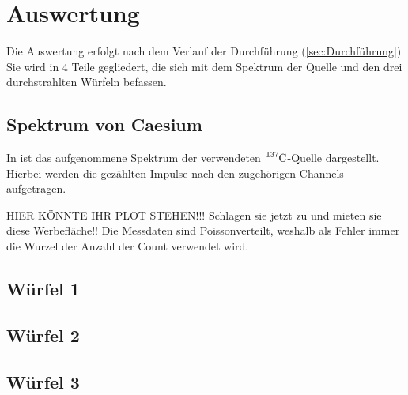 \section{Auswertung}
\label{sec:Auswertung}
Die Auswertung erfolgt nach dem Verlauf der Durchführung (\autoref{sec:Durchführung})
Sie wird in 4 Teile gegliedert, die sich mit dem Spektrum der Quelle und den drei durchstrahlten Würfeln befassen.

\subsection{Spektrum von Caesium}
\label{sub:Spektrum}

In
ist das aufgenommene Spektrum der verwendeten $\ce{^{137}C}$-Quelle dargestellt.
Hierbei werden die gezählten Impulse nach den zugehörigen Channels aufgetragen.

HIER KÖNNTE IHR PLOT STEHEN!!! Schlagen sie jetzt zu und mieten sie diese Werbefläche!!
Die Messdaten sind Poissonverteilt, weshalb als Fehler immer die Wurzel der Anzahl der
Count verwendet wird.
\subsection{Würfel 1}
\label{sub:1}

\subsection{Würfel 2}
\label{sub:2}

\subsection{Würfel 3}
\label{sub:3}